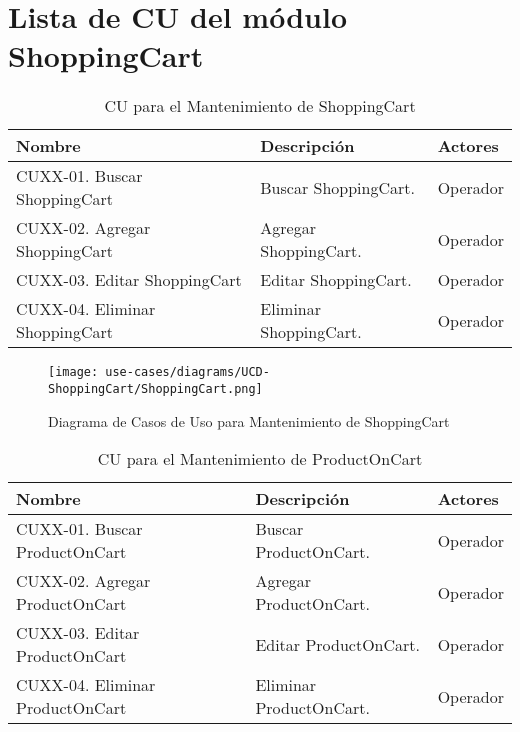 
	\section{Lista de CU del m\'odulo ShoppingCart} \label{sec:uc-shoppingcart}

	\begin{table}[H]
		\caption{CU para el Mantenimiento de ShoppingCart}
		\label{uc-entity-shoppingcart}
		\begin{center}
		\begin{tabularx}{0.90\linewidth}{ X X X }
			\hline
			\textbf{Nombre} & \textbf{Descripci\'on} & \textbf{Actores} \\
			\hline
			CUXX-01. Buscar ShoppingCart & Buscar ShoppingCart. & Operador \\
			CUXX-02. Agregar ShoppingCart & Agregar ShoppingCart. & Operador \\
			CUXX-03. Editar ShoppingCart & Editar ShoppingCart. & Operador \\
			CUXX-04. Eliminar ShoppingCart & Eliminar ShoppingCart. & Operador \\
			\hline
		\end{tabularx}
		\end{center}
	\end{table}
	
	\begin{figure}[H]
		\begin{center}
		\label{tab:ucd-entity-shoppingcart}
		\texttt{[image: use-cases/diagrams/UCD-ShoppingCart/ShoppingCart.png]}
		\caption{Diagrama de Casos de Uso para Mantenimiento de ShoppingCart}
		\end{center}
	\end{figure}
	\begin{table}[H]
		\caption{CU para el Mantenimiento de ProductOnCart}
		\label{uc-entity-productoncart}
		\begin{center}
		\begin{tabularx}{0.90\linewidth}{ X X X }
			\hline
			\textbf{Nombre} & \textbf{Descripci\'on} & \textbf{Actores} \\
			\hline
			CUXX-01. Buscar ProductOnCart & Buscar ProductOnCart. & Operador \\
			CUXX-02. Agregar ProductOnCart & Agregar ProductOnCart. & Operador \\
			CUXX-03. Editar ProductOnCart & Editar ProductOnCart. & Operador \\
			CUXX-04. Eliminar ProductOnCart & Eliminar ProductOnCart. & Operador \\
			\hline
		\end{tabularx}
		\end{center}
	\end{table}
	
